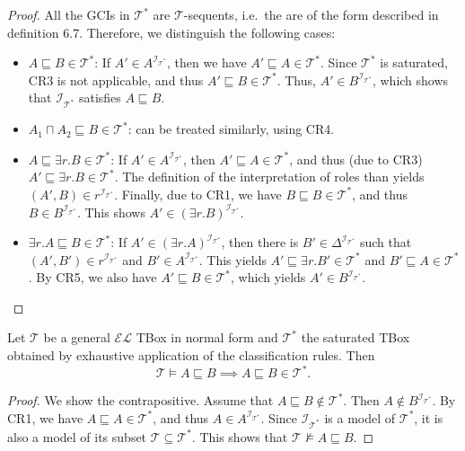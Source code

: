 \begin{proof}
	All the GCIs in $\mathcal{T}^*$ are $\mathcal{T}$-sequents,
	i.e.\ the are of the form described in definition 6.7.
	Therefore, we distinguish the following cases:
	 \begin{itemize}
		\item $A \sqsubseteq B \in \mathcal{T}^*$:
			If $A' \in A^{\mathcal{I}_{\mathcal{T}^*}}$, then we have $A' \sqsubseteq A \in \mathcal{T}^*$.
			Since $\mathcal{T}^*$ is saturated, CR3 is not applicable,
			and thus $A' \sqsubseteq B \in \mathcal{T}^*$.
			Thus, $A' \in B^{\mathcal{I}_{\mathcal{T}^*}}$, which shows that $\mathcal{I}_{\mathcal{T}^*}$
			satisfies  $A \sqsubseteq B$.
		\item $A_1 \sqcap A_2 \sqsubseteq B \in \mathcal{T}^*$: can be treated similarly, using CR4.
		\item $A \sqsubseteq \exists r.B \in \mathcal{T}^*$:
			If  $A' \in A^{\mathcal{I}_{\mathcal{T}^*}}$, then $A' \sqsubseteq A \in \mathcal{T}^*$,
			and thus (due to CR3) $A' \sqsubseteq \exists r.B \in \mathcal{T}^*$.
			The definition of the interpretation of roles than yields $(A', B) \in r^{\mathcal{I}_{\mathcal{T}^*}}$.
			Finally, due to CR1, we have $B \sqsubseteq B \in \mathcal{T}^*$, and thus $B \in B^{\mathcal{I}_{\mathcal{T}^*}}$.
			This shows $A' \in (\exists r.B)^{\mathcal{I}_{\mathcal{T}^*}}$.
		\item $\exists r.A \sqsubseteq B \in \mathcal{T}^*$:
			If $A' \in (\exists r.A)^{\mathcal{I}_{\mathcal{T}^*}}$,
			then there is $B' \in \Delta^{\mathcal{I}_{\mathcal{T}^*}}$ such that $(A', B') \in r^{\mathcal{I}_{\mathcal{T}^*}}$ 
			and $B' \in A^{\mathcal{I}_{\mathcal{T}^*}}$.
			This yields $A' \sqsubseteq \exists r.B' \in \mathcal{T}^*$ 
			and $B' \sqsubseteq A \in \mathcal{T}^*$.
			By CR5, we also have $A' \sqsubseteq B \in \mathcal{T}^*$,
			which yields $A' \in B^{\mathcal{I}_{\mathcal{T}^*}}$.
			\qedhere
	\end{itemize}
\end{proof}

\begin{lemma}[Completeness]
	Let $\mathcal{T}$ be a general $\mathcal{EL}$ TBox in normal form
	and $\mathcal{T}^*$ the saturated TBox obtained by exhaustive application of the classification rules.
	Then
	\[
	\mathcal{T} \vDash A \sqsubseteq B \implies A \sqsubseteq B \in \mathcal{T}^*
	.\]
\end{lemma}
\begin{proof}
	We show the contrapositive.
	Assume that $A \sqsubseteq B \notin \mathcal{T}^*$.
	Then $A \notin B^{\mathcal{I}_{\mathcal{T}^*}}$.
	By CR1, we have $A \sqsubseteq A \in \mathcal{T}^*$, and thus $A \in A^{\mathcal{I}_{\mathcal{T}^*}}$.
	Since $\mathcal{I}_{\mathcal{T}^*}$ is a model of  $\mathcal{T}^*$,
	it is also a model of its subset $\mathcal{T} \subseteq \mathcal{T}^*$.
	This shows that $\mathcal{T} \not\vDash A \sqsubseteq B$.
\end{proof}

